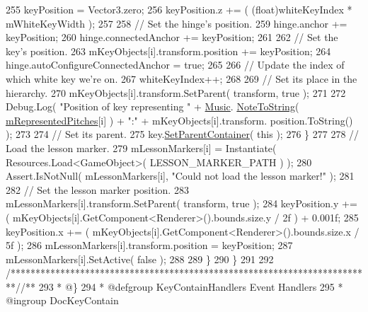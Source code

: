 \begin{DoxyCodeInclude}
255                 keyPosition = Vector3.zero;
256                 keyPosition.z += ( (float)whiteKeyIndex * mWhiteKeyWidth );
257 
258                 \textcolor{comment}{// Set the hinge's position.}
259                 hinge.anchor += keyPosition;
260                 hinge.connectedAnchor += keyPosition;
261 
262                 \textcolor{comment}{// Set the key's position.}
263                 mKeyObjects[i].transform.position += keyPosition;
264                 hinge.autoConfigureConnectedAnchor = \textcolor{keyword}{true};
265 
266                 \textcolor{comment}{// Update the index of which white key we're on.}
267                 whiteKeyIndex++;
268 
269                 \textcolor{comment}{// Set its place in the hierarchy.}
270                 mKeyObjects[i].transform.SetParent( transform, \textcolor{keyword}{true} ); 
271 
272                 Debug.Log( \textcolor{stringliteral}{"Position of key representing "} + \hyperlink{class_music}{Music}.
      \hyperlink{group___music_stat_func_ga85a22c905d56d4c5f4e62159bfecee8c}{NoteToString}( \hyperlink{group___key_contain_priv_var_ga103945a6efe3469191e5253d13fec5be}{mRepresentedPitches}[i] ) + \textcolor{stringliteral}{":"} + mKeyObjects[i].transform.
      position.ToString() );
273 
274                 \textcolor{comment}{// Set its parent.}
275                 key.\hyperlink{group___white_key_pub_func_gab926585e88db73a20431ac93d979b61d}{SetParentContainer}( \textcolor{keyword}{this} );
276             \}
277 
278             \textcolor{comment}{// Load the lesson marker.}
279             mLessonMarkers[i] = Instantiate( Resources.Load<GameObject>( LESSON\_MARKER\_PATH ) );
280             Assert.IsNotNull( mLessonMarkers[i], \textcolor{stringliteral}{"Could not load the lesson marker!"} );
281 
282             \textcolor{comment}{// Set the lesson marker position.}
283             mLessonMarkers[i].transform.SetParent( transform, \textcolor{keyword}{true} );
284             keyPosition.y += ( mKeyObjects[i].GetComponent<Renderer>().bounds.size.y / 2f ) + 0.001f;
285             keyPosition.x += ( mKeyObjects[i].GetComponent<Renderer>().bounds.size.x / 5f );
286             mLessonMarkers[i].transform.position = keyPosition;
287             mLessonMarkers[i].SetActive( \textcolor{keyword}{false} );
288 
289         \}
290     \}
291 
292     \textcolor{comment}{/*************************************************************************/}\textcolor{comment}{/** }
293 \textcolor{comment}{    * @\}}
294 \textcolor{comment}{    * @defgroup KeyContainHandlers Event Handlers}
295 \textcolor{comment}{    * @ingroup DocKeyContain}

\end{DoxyCodeInclude}
